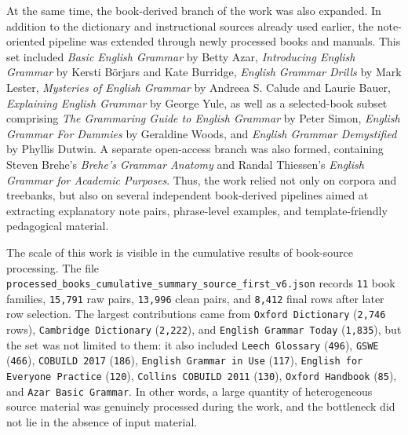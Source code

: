 \documentclass[12pt,a4paper,oneside]{report}
\begin{document}
At the same time, the book-derived branch of the work was also expanded. In addition to the dictionary and instructional sources already used earlier, the note-oriented pipeline was extended through newly processed books and manuals. This set included \emph{Basic English Grammar} by Betty Azar, \emph{Introducing English Grammar} by Kersti B\"orjars and Kate Burridge, \emph{English Grammar Drills} by Mark Lester, \emph{Mysteries of English Grammar} by Andreea S. Calude and Laurie Bauer, \emph{Explaining English Grammar} by George Yule, as well as a selected-book subset comprising \emph{The Grammaring Guide to English Grammar} by Peter Simon, \emph{English Grammar For Dummies} by Geraldine Woods, and \emph{English Grammar Demystified} by Phyllis Dutwin. A separate open-access branch was also formed, containing Steven Brehe's \emph{Brehe's Grammar Anatomy} and Randal Thiessen's \emph{English Grammar for Academic Purposes}. Thus, the work relied not only on corpora and treebanks, but also on several independent book-derived pipelines aimed at extracting explanatory note pairs, phrase-level examples, and template-friendly pedagogical material.

The scale of this work is visible in the cumulative results of book-source processing. The file \texttt{processed\_books\_cumulative\_summary\_source\_first\_v6.json} records \texttt{11} book families, \texttt{15,791} raw pairs, \texttt{13,996} clean pairs, and \texttt{8,412} final rows after later row selection. The largest contributions came from \texttt{Oxford Dictionary} (\texttt{2,746} rows), \texttt{Cambridge Dictionary} (\texttt{2,222}), and \texttt{English Grammar Today} (\texttt{1,835}), but the set was not limited to them: it also included \texttt{Leech Glossary} (\texttt{496}), \texttt{GSWE} (\texttt{466}), \texttt{COBUILD 2017} (\texttt{186}), \texttt{English Grammar in Use} (\texttt{117}), \texttt{English for Everyone Practice} (\texttt{120}), \texttt{Collins COBUILD 2011} (\texttt{130}), \texttt{Oxford Handbook} (\texttt{85}), and \texttt{Azar Basic Grammar}. In other words, a large quantity of heterogeneous source material was genuinely processed during the work, and the bottleneck did not lie in the absence of input material.
\end{document}
